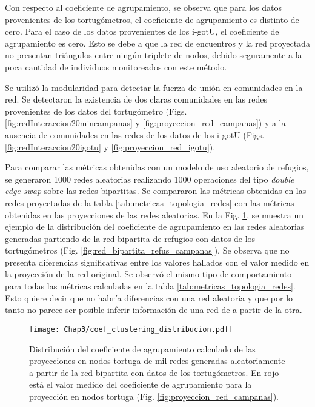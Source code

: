 Con respecto al coeficiente de agrupamiento, se observa que para los datos provenientes de los tortugómetros, el coeficiente de agrupamiento es distinto de cero. Para el caso de los datos provenientes de los i-gotU, el coeficiente de agrupamiento es cero. Esto se debe a que la red de encuentros y la red proyectada no presentan triángulos entre ningún triplete de nodos, debido seguramente a la poca cantidad de individuos monitoreados con este método.
 
Se utilizó la modularidad para detectar la fuerza de unión en comunidades en la red. Se detectaron la existencia de dos claras comunidades en las redes provenientes de los datos del tortugómetro (Figs. \ref{fig:redInteraccion20mincampanas} y \ref{fig:proyeccion_red_campanas}) y a la ausencia de comunidades en las redes de los datos de los i-gotU (Figs. \ref{fig:redInteraccion20igotu} y \ref{fig:proyeccion_red_igotu}).
 
Para comparar las métricas obtenidas con un modelo de uso aleatorio de refugios, se generaron 1000 redes aleatorias  realizando 1000 operaciones del tipo \textit{double edge swap} sobre las redes bipartitas. Se compararon las métricas obtenidas en las redes proyectadas de la tabla \ref{tab:metricas_topologia_redes} con las métricas obtenidas en las proyecciones de las redes aleatorias. En la Fig. \ref{fig:distribucion_coef_agrupa}, se muestra un ejemplo de la distribución del coeficiente de agrupamiento en las redes aleatorias generadas partiendo de la red bipartita de refugios con datos de los tortugómetros (Fig. \ref{fig:red_bipartita_refus_campanas}). Se observa que no presenta diferencias significativas entre los valores hallados con el valor medido en la proyección de la red original. Se observó el mismo tipo de comportamiento para todas las métricas calculadas en la tabla \ref{tab:metricas_topologia_redes}. Esto quiere decir que no habría diferencias con una red aleatoria y que por lo tanto no parece ser posible inferir información de una red de a partir de la otra.
\begin{figure}[ht]
    \begin{center}
        \texttt{[image: Chap3/coef\_clustering\_distribucion.pdf]}
        \caption[Distribución del coeficiente de agrupamiento en proyecciones de redes aleatorias.]{Distribución del coeficiente de agrupamiento calculado de las proyecciones en nodos tortuga de mil redes generadas aleatoriamente a partir de la red bipartita con datos de los tortugómetros. En rojo está el valor medido del coeficiente de agrupamiento para la proyección en nodos tortuga (Fig. \ref{fig:proyeccion_red_campanas}).}
        \label{fig:distribucion_coef_agrupa}
       
        \end{center}
\end{figure}
 
